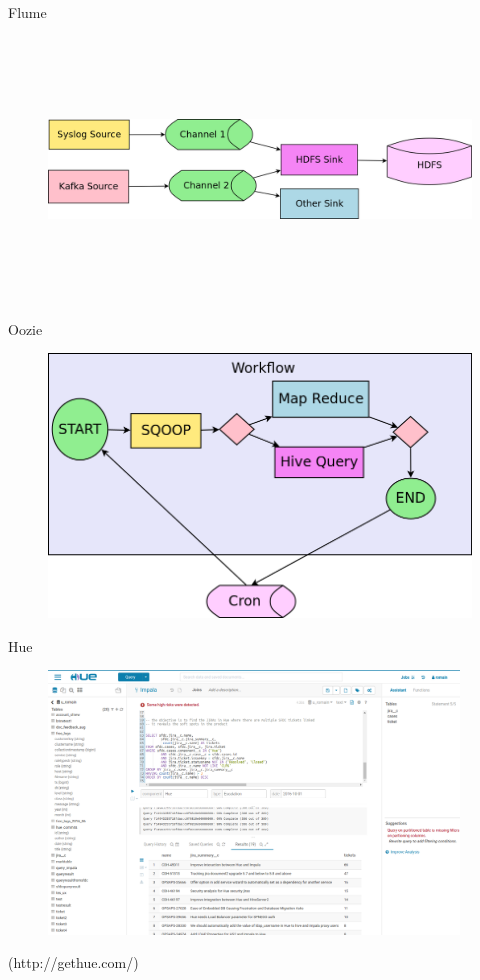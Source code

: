 \documentclass{beamer}
\begin{document}
\begin{frame}{Flume}
	\begin{figure}
		\includegraphics[width=\textwidth,height=7cm,keepaspectratio=true]{flume}
	\end{figure}
\end{frame}
\begin{frame}{Oozie}
	\begin{figure}
		\includegraphics[width=\textwidth,height=7cm,keepaspectratio=true]{oozie}
	\end{figure}
\end{frame}
\begin{frame}{Hue}
	\begin{figure}
		\includegraphics[width=\textwidth,height=7cm,keepaspectratio=true]{hue}
	\end{figure}
	\begin{center}
		{\tiny (http://gethue.com/)}
	\end{center}
\end{frame}
\end{document}
